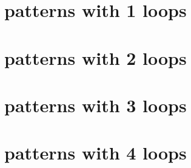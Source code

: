 

\section{patterns with 1 loops}




















\section{patterns with 2 loops}






















\section{patterns with 3 loops}




\section{patterns with 4 loops}



